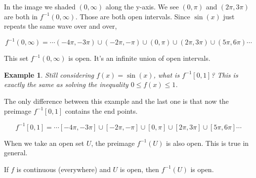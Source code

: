 \documentclass[11pt]{book}
\newtheorem{example}{Example}
\numberwithin{example}{chapter}
\begin{document}
\begin{center}
\end{center}






In the image we shaded $(0,\infty)$ along the y-axis.  We see $(0,\pi)$ and $(2\pi,3\pi)$ are both in $f^{-1}(0,\infty)$.  Those are both open intervals.  Since $\sin(x)$ just repeats the same wave over and over, 

$$f^{-1}(0,\infty) = \cdots (-4\pi,-3\pi)\cup (-2\pi,-\pi) \cup  (0,\pi) \cup  (2\pi,3\pi) \cup  (5\pi,6\pi) \cdots $$

This set $f^{-1}(0,\infty)$ is open.  It's an infinite union of open intervals.  


\begin{example}
Still considering $f(x)=\sin(x)$, what is $f^{-1}[0,1]$?  This is exactly the same as solving the inequality $0\leq f(x) \leq 1$.  
\end{example}

The only difference between this example and the last one is that now the preimage $f^{-1}[0,1]$ contains the end points.  

$$f^{-1}[0,1] = \cdots [-4\pi,-3\pi]\cup [-2\pi,-\pi] \cup  [0,\pi] \cup  [2\pi,3\pi] \cup  [5\pi,6\pi] \cdots $$

When we take an open set $U$, the preimage $f^{-1}(U)$ is also open.  This is true in general.

\begin{theorem}
If $f$ is continuous (everywhere) and $U$ is open, then $f^{-1}(U)$ is open.
\end{theorem}
\end{document}

